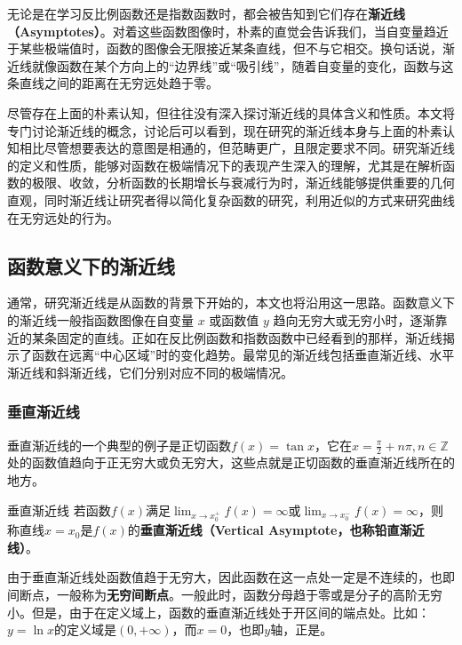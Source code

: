 
\begin{issues}
\issueDraft
\end{issues}

无论是在学习反比例函数还是指数函数时，都会被告知到它们存在\textbf{渐近线（Asymptotes）}。对着这些函数图像时，朴素的直觉会告诉我们，当自变量趋近于某些极端值时，函数的图像会无限接近某条直线，但不与它相交。换句话说，渐近线就像函数在某个方向上的“边界线”或“吸引线”，随着自变量的变化，函数与这条直线之间的距离在无穷远处趋于零。

尽管存在上面的朴素认知，但往往没有深入探讨渐近线的具体含义和性质。本文将专门讨论渐近线的概念，讨论后可以看到，现在研究的渐近线本身与上面的朴素认知相比尽管想要表达的意图是相通的，但范畴更广，且限定要求不同。研究渐近线的定义和性质，能够对函数在极端情况下的表现产生深入的理解，尤其是在解析函数的极限、收敛，分析函数的长期增长与衰减行为时，渐近线能够提供重要的几何直观，同时渐近线让研究者得以简化复杂函数的研究，利用近似的方式来研究曲线在无穷远处的行为。

\subsection{函数意义下的渐近线}

通常，研究渐近线是从函数的背景下开始的，本文也将沿用这一思路。函数意义下的渐近线一般指函数图像在自变量 $x$ 或函数值 $y$ 趋向无穷大或无穷小时，逐渐靠近的某条固定的直线。正如在反比例函数和指数函数中已经看到的那样，渐近线揭示了函数在远离“中心区域”时的变化趋势。最常见的渐近线包括垂直渐近线、水平渐近线和斜渐近线，它们分别对应不同的极端情况。

\subsubsection{垂直渐近线}

垂直渐近线的一个典型的例子是正切函数$f(x)=\tan x$，它在$\displaystyle x = \frac{\pi}{2} + n\pi,n \in \mathbb{Z}$处的函数值趋向于正无穷大或负无穷大，这些点就是正切函数的垂直渐近线所在的地方。

\begin{definition}{垂直渐近线}
若函数$f(x)$满足$\displaystyle \lim_{x\to x_0^+}f(x)=\infty$或$\displaystyle \lim_{x\to x_0^-}f(x)=\infty$，则称直线$x=x_0$是$f(x)$的\textbf{垂直渐近线（Vertical Asymptote，也称铅直渐近线）}。
\end{definition}

由于垂直渐近线处函数值趋于无穷大，因此函数在这一点处一定是不连续的，也即间断点，一般称为\textbf{无穷间断点}。一般此时，函数分母趋于零或是分子的高阶无穷小。但是，由于在定义域上，函数的垂直渐近线处于开区间的端点处。比如：$y=\ln x$的定义域是$(0,+\infty)$，而$x=0$，也即$y$轴，正是。

